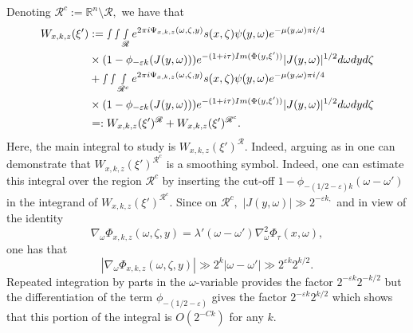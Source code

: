 \documentclass[12pt, reqno]{amsart}
\theoremstyle{definition}
\theoremstyle{remark}
\numberwithin{equation}{section}
\begin{document}
 Denoting $\mathscr{R}^c:=\mathbb{R}^n\setminus \mathscr{R},$ we have that
\begin{align*}
 W_{x,k,z}(\xi')&:= \smallint\smallint\smallint_{\mathscr{R}} e^{2\pi i \Psi_{x,k,z}(\omega, \zeta,y) }s(x,\zeta)\psi(y,\omega)e^{-\mu(y,\omega)\pi i/4} \\
&\times (1-\phi_{-\varepsilon k}(J(y,\omega)))e^{-(1+i\tau)\textnormal{Im}(\Phi(y,\xi'))} |J(y,\omega)|^{1/2}d\omega dy d\zeta\\
&+ \smallint\smallint\smallint_{\mathscr{R}^{c}} e^{2\pi i \Psi_{x,k,z}(\omega, \zeta,y) }s(x,\zeta)\psi(y,\omega)e^{-\mu(y,\omega)\pi i/4} \\
&\times (1-\phi_{-\varepsilon k}(J(y,\omega)))e^{-(1+i\tau)\textnormal{Im}(\Phi(y,\xi'))} |J(y,\omega)|^{1/2}d\omega dy d\zeta\\
&=: W_{x,k,z}(\xi')^{\mathscr{R}}+ W_{x,k,z}(\xi')^{\mathscr{R}^c}.
\end{align*}
Here, the main integral to study is $ W_{x,k,z}(\xi')^{\mathscr{R}}.$ Indeed, arguing as in \cite[Page 17]{Tao} one can demonstrate that $W_{x,k,z}(\xi')^{\mathscr{R}^c}$ is a smoothing symbol. Indeed, one can estimate this integral over the region $\mathscr{R}^c$ by inserting the cut-off $1-\phi_{-(1/2-\varepsilon)k}(\omega-\omega')$ in the integrand of $W_{x,k,z}(\xi')^{\mathscr{R}^c}.$ Since on $\mathscr{R}^c,$ $|J(y,\omega)|\gg 2^{-\varepsilon k,}$ and in view of the identity 
$$\nabla_\omega \Phi_{x,k,z}(\omega,\zeta,y)=\lambda'(\omega-\omega')\nabla_\omega^2\Phi_\tau(x,\omega),$$
one has that
$$|\nabla_\omega \Phi_{x,k,z}(\omega,\zeta,y)|\gg 2^{k}|\omega-\omega'|\gg 2^{\varepsilon k}2^{k/2}.$$ Repeated integration by parts in the $\omega$-variable provides the factor $2^{-\varepsilon k}2^{-k/2}$ but the differentiation of the  term $\phi_{-(1/2-\varepsilon)}$ gives the factor $2^{-\varepsilon k}2^{k/2}$ which shows that this portion of the integral is $O(2^{-Ck})$ for any $k.$
\end{document}
